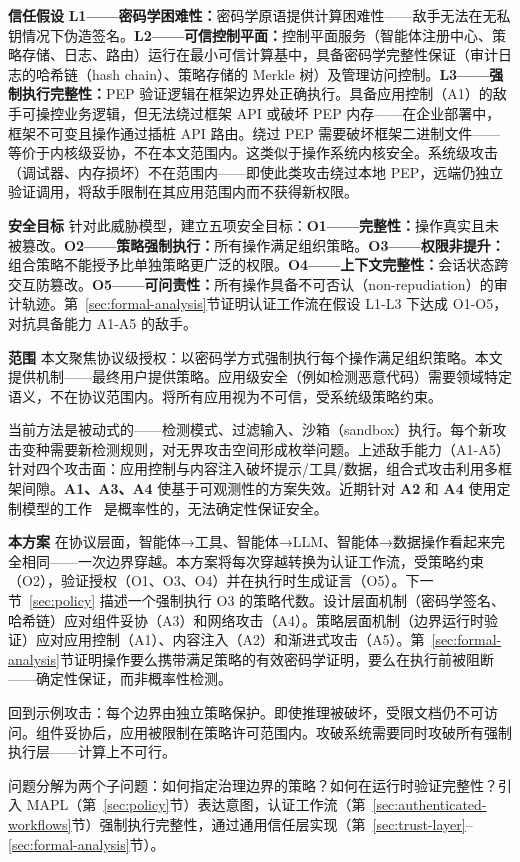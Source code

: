 \textbf{信任假设} \textbf{L1——密码学困难性：}密码学原语提供计算困难性——敌手无法在无私钥情况下伪造签名。\textbf{L2——可信控制平面：}控制平面服务（智能体注册中心、策略存储、日志、路由）运行在最小可信计算基中，具备密码学完整性保证（审计日志的哈希链（hash chain）、策略存储的 Merkle 树）及管理访问控制。\textbf{L3——强制执行完整性：}PEP 验证逻辑在框架边界处正确执行。具备应用控制（A1）的敌手可操控业务逻辑，但无法绕过框架 API 或破坏 PEP 内存——在企业部署中，框架不可变且操作通过插桩 API 路由。绕过 PEP 需要破坏框架二进制文件——等价于内核级妥协，不在本文范围内。这类似于操作系统内核安全。系统级攻击（调试器、内存损坏）不在范围内——即使此类攻击绕过本地 PEP，远端仍独立验证调用，将敌手限制在其应用范围内而不获得新权限。

\textbf{安全目标} 针对此威胁模型，建立五项安全目标：\textbf{O1——完整性：}操作真实且未被篡改。\textbf{O2——策略强制执行：}所有操作满足组织策略。\textbf{O3——权限非提升：}组合策略不能授予比单独策略更广泛的权限。\textbf{O4——上下文完整性：}会话状态跨交互防篡改。\textbf{O5——可问责性：}所有操作具备不可否认（non-repudiation）的审计轨迹。第~\ref{sec:formal-analysis}节证明认证工作流在假设 L1-L3 下达成 O1-O5，对抗具备能力 A1-A5 的敌手。

\textbf{范围} 本文聚焦协议级授权：以密码学方式强制执行每个操作满足组织策略。本文提供机制——最终用户提供策略。应用级安全（例如检测恶意代码）需要领域特定语义，不在协议范围内。将所有应用视为不可信，受系统级策略约束。

当前方法是被动式的——检测模式、过滤输入、沙箱（sandbox）执行。每个新攻击变种需要新检测规则，对无界攻击空间形成枚举问题。上述敌手能力（A1-A5）针对四个攻击面：应用控制与内容注入破坏提示/工具/数据，组合式攻击利用多框架间隙。\textbf{A1、A3、A4} 使基于可观测性的方案失效。近期针对 \textbf{A2} 和 \textbf{A4} 使用定制模型的工作~\cite{camel2023} 是概率性的，无法确定性保证安全。

\textbf{本方案} 在协议层面，智能体→工具、智能体→LLM、智能体→数据操作看起来完全相同——一次边界穿越。本方案将每次穿越转换为认证工作流，受策略约束（O2），验证授权（O1、O3、O4）并在执行时生成证言（O5）。下一节~\ref{sec:policy} 描述一个强制执行 O3 的策略代数。设计层面机制（密码学签名、哈希链）应对组件妥协（A3）和网络攻击（A4）。策略层面机制（边界运行时验证）应对应用控制（A1）、内容注入（A2）和渐进式攻击（A5）。第~\ref{sec:formal-analysis}节证明操作要么携带满足策略的有效密码学证明，要么在执行前被阻断——确定性保证，而非概率性检测。

回到示例攻击：每个边界由独立策略保护。即使推理被破坏，受限文档仍不可访问。组件妥协后，应用被限制在策略许可范围内。攻破系统需要同时攻破所有强制执行层——计算上不可行。

问题分解为两个子问题：如何指定治理边界的策略？如何在运行时验证完整性？引入 MAPL（第~\ref{sec:policy}节）表达意图，认证工作流（第~\ref{sec:authenticated-workflows}节）强制执行完整性，通过通用信任层实现（第~\ref{sec:trust-layer}--\ref{sec:formal-analysis}节）。
